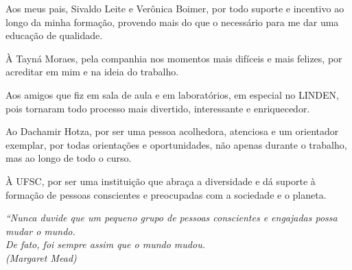 
\begin{agradecimentos}
	Aos meus pais, Sivaldo Leite e Verônica Boimer, por todo suporte e incentivo ao longo da minha formação, provendo mais do que o necessário para me dar uma educação de qualidade.

	À Tayná Moraes, pela companhia nos momentos mais difíceis e mais felizes, por acreditar em mim e na ideia do trabalho.

	Aos amigos que fiz em sala de aula e em laboratórios, em especial no LINDEN, pois tornaram todo processo mais divertido, interessante e enriquecedor.

	Ao Dachamir Hotza, por ser uma pessoa acolhedora, atenciosa e um orientador exemplar, por todas orientações e oportunidades, não apenas durante o trabalho, mas ao longo de todo o curso.

	À UFSC, por ser uma instituição que abraça a diversidade e dá suporte à formação de pessoas conscientes e preocupadas com a sociedade e o planeta.


\end{agradecimentos}

\begin{epigrafe}
	\vspace*{\fill}
	\begin{flushright}
		\textit{``Nunca duvide que um pequeno grupo de pessoas conscientes e engajadas possa mudar o mundo.\\
			De fato, foi sempre assim que o mundo mudou.\\
			(Margaret Mead)}
	\end{flushright}
\end{epigrafe}


